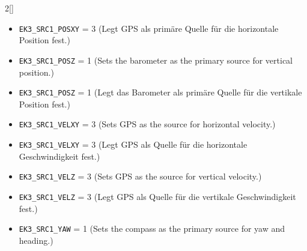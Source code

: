 \begin{paracol}{2}[]
\colger

\begin{itemize}
\item \verb!EK3_SRC1_POSXY! = 3 \quad (Legt GPS als primäre Quelle für die horizontale Position fest.)
\end{itemize}

\coleng

\begin{itemize}
\item \verb!EK3_SRC1_POSZ! = 1 \quad (Sets the barometer as the primary source for vertical position.)
\end{itemize}

\colger

\begin{itemize}
\item \verb!EK3_SRC1_POSZ! = 1 \quad (Legt das Barometer als primäre Quelle für die vertikale Position fest.)
\end{itemize}

\coleng

\begin{itemize}
\item \verb!EK3_SRC1_VELXY! = 3 \quad (Sets GPS as the source for horizontal velocity.)
\end{itemize}

\colger

\begin{itemize}
\item \verb!EK3_SRC1_VELXY! = 3 \quad (Legt GPS als Quelle für die horizontale Geschwindigkeit fest.)
\end{itemize}

\coleng

\begin{itemize}
\item \verb!EK3_SRC1_VELZ! = 3 \quad (Sets GPS as the source for vertical velocity.)
\end{itemize}

\colger

\begin{itemize}
\item \verb!EK3_SRC1_VELZ! = 3 \quad (Legt GPS als Quelle für die vertikale Geschwindigkeit fest.)
\end{itemize}

\coleng

\begin{itemize}
\item \verb!EK3_SRC1_YAW! = 1 \quad (Sets the compass as the primary source for yaw and heading.)
\end{itemize}


\end{paracol}
